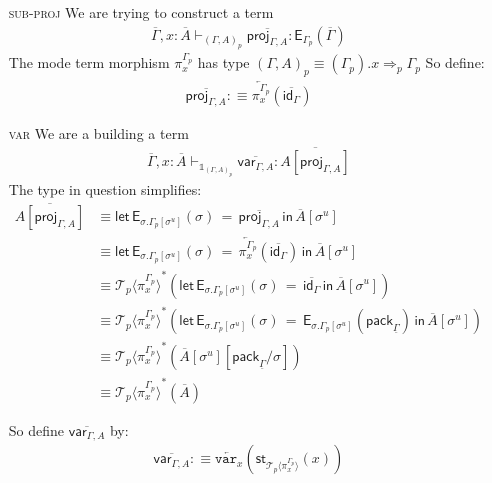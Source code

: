 \documentclass[10pt]{article}
\theoremstyle{definition}
\newcommand{\yields}{\vdash}
\newcommand{\tcell}{\Rightarrow}
\newcommand{\id}{\mathsf{id}}
\newcommand{\rewrite}[2]{\overleftarrow{#1}(#2)}
\newcommand\E[2]{\ensuremath{\mathsf{E}_{#1}(#2)}}
\newcommand\St[2]{\ensuremath{{#1}^*(#2)}}
\newcommand\StI[2]{\ensuremath{\mathsf{st}_{#1}(#2)}}
\newcommand\EEs[4]{\ensuremath{\mathsf{let} \, \mathsf{E}_{#1}(#3) \, = \, {#2} \, \mathsf{in} \, #4}}
\newcommand\EIs[2]{\ensuremath{\mathsf{E}_{#1}{(#2)}}}
\newcommand\ApEl[2]{\mathcal{T}_{#1}\langle#2\rangle}
\newcommand\pack[1]{\ensuremath{\mathsf{pack}_{#1}}}
\newcommand\unp[2]{\ensuremath{{#2}^u}}
\newcommand{\modeof}[1]{{#1}_p}
\newcommand{\upstairs}[1]{\overline{#1}}
\newcommand{\downstairs}[1]{\underline{#1}}
\newcommand\proj[1]{\ensuremath{\mathsf{proj}_{#1}}}
\newcommand\qvar[1]{\ensuremath{\mathsf{var}_{#1}}}
\newcommand\One{\ensuremath{\mathds{1}}}
\newcommand\var[1]{\ensuremath{\mathtt{var}_{#1}}}
\begin{document}
\begin{enumerate}
\item[\textsc{sub-proj}] We are trying to construct a term
\begin{align*}
\upstairs{\Gamma}, x : \upstairs{A} \yields_{\modeof{(\Gamma, A)}} \upstairs{\proj{\Gamma, A}} : \E{\modeof{\Gamma}}{\upstairs{\Gamma}}
\end{align*}
The mode term morphism $\pi^{\modeof{\Gamma}}_x$ has type $\modeof{(\Gamma, A)} \equiv (\modeof{\Gamma}).x \tcell_{p} \modeof{\Gamma}$
So define:
\begin{align*}
\upstairs{\proj{\Gamma, A}} :\equiv \rewrite{\pi^{\modeof{\Gamma}}_x}{\upstairs{\id_\Gamma}}
\end{align*}

\item[\textsc{var}] We are a building a term
\begin{align*}
\upstairs{\Gamma}, x : \upstairs{A} \yields_{\One_{\modeof{(\Gamma, A)}}} \upstairs{\qvar{\Gamma, A}} : \upstairs{A[\proj{\Gamma, A}]}
\end{align*}
The type in question simplifies:
\begin{align*}
\upstairs{A[\proj{\Gamma, A}]}
&\equiv \EEs{\sigma.\modeof{\Gamma}[\unp{\Gamma}{\sigma}]}{\upstairs{\proj{\Gamma, A}}}{\sigma}{\upstairs{A}[\unp{\Gamma}{\sigma}]} \\
&\equiv \EEs{\sigma.\modeof{\Gamma}[\unp{\Gamma}{\sigma}]}{\rewrite{\pi^{\modeof{\Gamma}}_x}{\upstairs{\id_\Gamma}}}{\sigma}{\upstairs{A}[\unp{\Gamma}{\sigma}]} \\
&\equiv \St{\ApEl{p}{\pi^{\modeof{\Gamma}}_x}}{\EEs{\sigma.\modeof{\Gamma}[\unp{\Gamma}{\sigma}]}{\upstairs{\id_\Gamma}}{\sigma}{\upstairs{A}[\unp{\Gamma}{\sigma}]}} \\
&\equiv \St{\ApEl{p}{\pi^{\modeof{\Gamma}}_x}}{\EEs{\sigma.\modeof{\Gamma}[\unp{\Gamma}{\sigma}]}{\EIs{\sigma.\modeof{\Gamma}[\unp{\Gamma}{\sigma}]}{\pack{\downstairs{\Gamma}}}}{\sigma}{\upstairs{A}[\unp{\Gamma}{\sigma}]}} \\
&\equiv \St{\ApEl{p}{\pi^{\modeof{\Gamma}}_x}}{\upstairs{A}[\unp{\Gamma}{\sigma}][\pack{\downstairs{\Gamma}}/\sigma]} \\
&\equiv \St{\ApEl{p}{\pi^{\modeof{\Gamma}}_x}}{\upstairs{A}}
\end{align*}

So define $\upstairs{\qvar{\Gamma, A}}$ by:
\begin{align*}
\upstairs{\qvar{\Gamma, A}} :\equiv \rewrite{\var{x}}{\StI{\ApEl{p}{\pi^{\modeof{\Gamma}}_x}}{x}}
\end{align*}
\end{enumerate}
\end{document}
